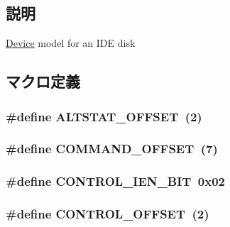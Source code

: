 \subsection{説明}
\hyperlink{namespaceDevice}{Device} model for an IDE disk 

\subsection{マクロ定義}
\hypertarget{ide__disk_8hh_ae0878ccca45f58e9438fd4b05593042b}{
\subsubsection[{ALTSTAT\_\-OFFSET}]{\setlength{\rightskip}{0pt plus 5cm}\#define ALTSTAT\_\-OFFSET~(2)}}
\label{ide__disk_8hh_ae0878ccca45f58e9438fd4b05593042b}
\hypertarget{ide__disk_8hh_adb83c033ee492824badb77fa8ebd5c5d}{
\subsubsection[{COMMAND\_\-OFFSET}]{\setlength{\rightskip}{0pt plus 5cm}\#define COMMAND\_\-OFFSET~(7)}}
\label{ide__disk_8hh_adb83c033ee492824badb77fa8ebd5c5d}
\hypertarget{ide__disk_8hh_ae9920e68c1f940e29dee8f47c5b0da54}{
\subsubsection[{CONTROL\_\-IEN\_\-BIT}]{\setlength{\rightskip}{0pt plus 5cm}\#define CONTROL\_\-IEN\_\-BIT~0x02}}
\label{ide__disk_8hh_ae9920e68c1f940e29dee8f47c5b0da54}
\hypertarget{ide__disk_8hh_ae15f861f15f995e6655f24ababa373b0}{
\subsubsection[{CONTROL\_\-OFFSET}]{\setlength{\rightskip}{0pt plus 5cm}\#define CONTROL\_\-OFFSET~(2)}}
\label{ide__disk_8hh_ae15f861f15f995e6655f24ababa373b0}
